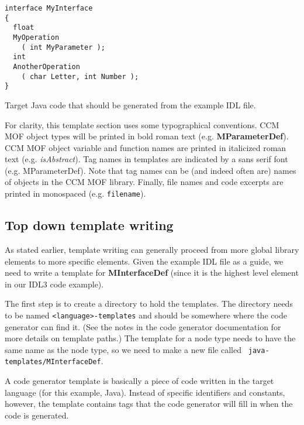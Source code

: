 \begin{Example}
\begin{minifbox}
\begin{verbatim}
interface MyInterface
{
  float
  MyOperation
    ( int MyParameter );
  int
  AnotherOperation
    ( char Letter, int Number );
}
\end{verbatim}
\caption{Target Java code that should be generated from the example IDL file.}
\label{example:component-generated-java}
\end{minifbox}
\end{Example}

For clarity, this template section uses some typographical conventions. CCM MOF
object types will be printed in bold roman text (e.g. {\bf MParameterDef}). CCM
MOF object variable and function names are printed in italicized roman text
(e.g. {\it isAbstract\/}). Tag names in templates are indicated by a sans serif
font (e.g. {\sf MParameterDef}). Note that tag names can be (and indeed often
are) names of objects in the CCM MOF library. Finally, file names and code
excerpts are printed in monospaced (e.g. {\tt filename}).

\subsection{Top down template writing}

As stated earlier, template writing can generally proceed from more global
library elements to more specific elements. Given the example IDL file as a
guide, we need to write a template for {\bf MInterfaceDef} (since it is the
highest level element in our IDL3 code example).

The first step is to create a directory to hold the templates. The directory
needs to be named {\tt <language>-templates} and should be somewhere where the
code generator can find it. (See the notes in the code generator documentation
for more details on template paths.) The template for a node type needs to have
the same name as the node type, so we need to make a new file called {\tt
java-templates/MInterfaceDef}.

A code generator template is basically a piece of code written in the target
language (for this example, Java). Instead of specific identifiers and
constants, however, the template contains tags that the code generator will fill
in when the code is generated.

